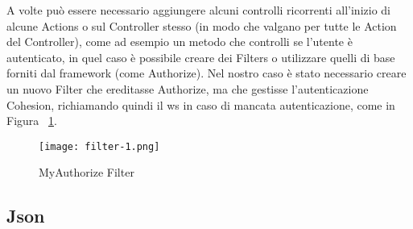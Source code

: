 A volte può essere necessario aggiungere alcuni controlli ricorrenti all'inizio di alcune Actions o sul Controller stesso (in modo che valgano per tutte le Action del Controller), come ad esempio un metodo che controlli se l'utente è autenticato, in quel caso è possibile creare dei Filters o utilizzare quelli di base forniti dal framework (come Authorize).
Nel nostro caso è stato necessario creare un nuovo Filter che ereditasse Authorize, ma che gestisse l'autenticazione Cohesion, richiamando quindi il \Gls{ws} in caso di mancata autenticazione, come in Figura ~\ref{fig:Filter1}.

\begin{figure}[H]
    \centering
    \texttt{[image: filter-1.png]}
    \caption{MyAuthorize Filter}
    \label{fig:Filter1}
\end{figure}


\subsection{Json}

